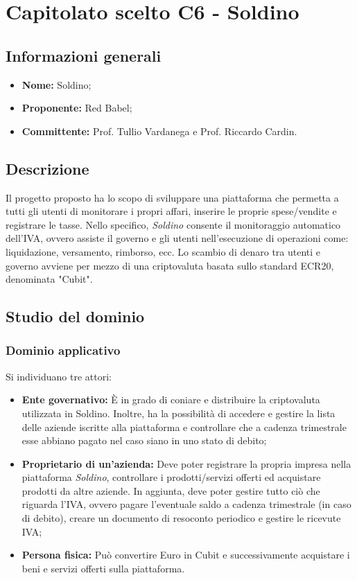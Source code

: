 \section{Capitolato scelto C6 - Soldino}
\subsection{Informazioni generali}
% 
\begin{itemize}
\item
\textbf{Nome:} Soldino;
\item
\textbf{Proponente:} Red Babel;
\item
\textbf{Committente:} Prof. Tullio Vardanega e Prof. Riccardo Cardin.
\end{itemize}

\subsection{Descrizione}
Il progetto proposto ha lo scopo di sviluppare una piattaforma che permetta a tutti gli utenti di monitorare i propri affari, inserire le proprie spese/vendite e registrare le tasse. Nello specifico, \textit{Soldino} consente il monitoraggio automatico dell'IVA, ovvero assiste il governo e gli utenti nell'esecuzione di operazioni come: liquidazione, versamento, rimborso, ecc. Lo scambio di denaro tra utenti e governo avviene per mezzo di una criptovaluta basata sullo standard ECR20\glo{}, denominata "Cubit"\glo{}. 


\subsection{Studio del dominio}
\subsubsection{Dominio applicativo}
Si individuano tre attori:
\begin{itemize}	
	\item \textbf{Ente governativo: }\`E in grado di coniare e distribuire la 
	criptovaluta utilizzata in Soldino. Inoltre, ha la possibilità di accedere e gestire la lista 
delle aziende iscritte alla piattaforma e controllare che a cadenza trimestrale 
esse abbiano pagato nel caso siano in uno stato di debito;
	\item \textbf{Proprietario di un'azienda:} Deve poter registrare la propria 
impresa nella piattaforma \textit{Soldino}, controllare i prodotti/servizi offerti ed acquistare 
prodotti da altre aziende. In aggiunta, deve poter gestire tutto ciò che riguarda 
l'IVA, ovvero pagare l'eventuale saldo a cadenza trimestrale (in caso di 
debito), creare un documento di resoconto periodico e gestire le ricevute IVA;
	\item \textbf{Persona fisica\glo: }Può convertire Euro in Cubit e 
successivamente acquistare i beni e servizi offerti sulla piattaforma. 
\end{itemize}
